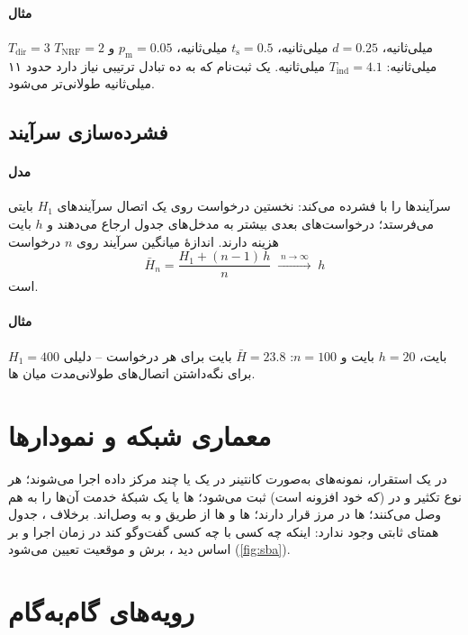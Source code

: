 \documentclass[11pt,a4paper]{article}
\begin{document}
\paragraph{مثال} $T_{\mathrm{dir}} = 3$ میلی‌ثانیه، $d = 0.25$ میلی‌ثانیه، $t_{\mathrm{s}} = 0.5$ میلی‌ثانیه، $p_{\mathrm{m}} = 0.05$ و
$T_{\mathrm{NRF}} = 2$ میلی‌ثانیه: $T_{\mathrm{ind}} = 4.1$ میلی‌ثانیه. یک ثبت‌نام که به ده تبادل ترتیبی  نیاز دارد حدود
۱۱ میلی‌ثانیه طولانی‌تر می‌شود.

\subsection{فشرده‌سازی سرآیند}\label{sec:hpack}
\paragraph{مدل}  سرآیندها را با  فشرده می‌کند: نخستین درخواست روی یک اتصال سرآیندهای $H_1$ بایتی می‌فرستد؛
درخواست‌های بعدی بیشتر به مدخل‌های جدول ارجاع می‌دهند و $h$ بایت هزینه دارند. اندازهٔ میانگین سرآیند روی $n$ درخواست
\begin{equation}\label{eq:hpack}
  \bar H_n = \frac{H_1 + (n-1)\,h}{n} \;\xrightarrow{\;n\to\infty\;}\; h
\end{equation}
است.
\paragraph{مثال} $H_1 = 400$ بایت، $h = 20$ بایت و $n = 100$: $\bar H = 23.8$ بایت برای هر درخواست -- دلیلی برای نگه‌داشتن
اتصال‌های طولانی‌مدت میان ها.

\section{معماری شبکه و نمودارها}
در یک استقرار، نمونه‌های  به‌صورت کانتینر در یک یا چند مرکز داده اجرا می‌شوند؛ هر نوع  تکثیر و در 
(که خود افزونه است) ثبت می‌شود؛ ها یا یک شبکهٔ خدمت آن‌ها را به هم وصل می‌کنند؛ ها در مرز قرار دارند؛
ها و ها از طریق  و  به  وصل‌اند. برخلاف ، جدول همتای ثابتی وجود ندارد: اینکه
چه کسی با چه کسی گفت‌وگو کند در زمان اجرا و بر اساس دید ، برش و موقعیت  تعیین می‌شود (\cref{fig:sba}).

\section{رویه‌های گام‌به‌گام}
\end{document}
